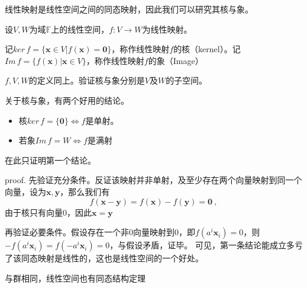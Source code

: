 

\begin{issues}
\issueTODO
\end{issues}

线性映射是线性空间之间的同态映射，因此我们可以研究其核与象。
\begin{definition}{}
设$V,W$为域$\mathbb F$上的线性空间，$f:V\rightarrow W$为线性映射。

记$ker\,f=\{\boldsymbol x\in V|f(\boldsymbol x)=\boldsymbol 0\}$，称作线性映射$f$的核（kernel）。记$Im\,f=\{f(\boldsymbol x)|\boldsymbol x\in V\}$，称作线性映射$f$的象（Image）
\end{definition}
\begin{exercise}{}
$f,V,W$的定义同上。验证核与象分别是$V$及$W$的子空间。
\end{exercise}
关于核与象，有两个好用的结论。
\begin{itemize}
\item 核$ker\,f=\{\boldsymbol 0\}\Longleftrightarrow f$是单射。
\item 若象$Im\,f=W\Longleftrightarrow f$是满射
\end{itemize}
在此只证明第一个结论。

proof.
先验证充分条件。反证该映射并非单射，及至少存在两个向量映射到同一个向量，设为$\boldsymbol{x,y}$，那么我们有
\begin{equation}
f(\boldsymbol{x}-\boldsymbol{y})=f(\boldsymbol x)-f(\boldsymbol y)=\boldsymbol 0~,
\end{equation}
由于核只有向量$0$，因此$\boldsymbol {x}=\boldsymbol{y}$

再验证必要条件。假设存在一个非$0$向量映射到$0$，即$f(a^i\boldsymbol x_i)=0$，则$-f(a^i\boldsymbol x_i)=f(-a^i\boldsymbol x_i)=0$，与假设矛盾，证毕。
可见，第一条结论能成立多亏了该同态映射是线性的，这也是线性空间的一个好处。

与群相同，线性空间也有同态结构定理